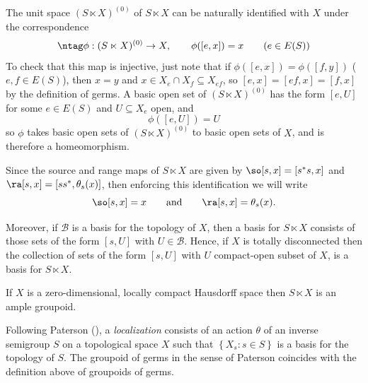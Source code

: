 The unit space $(S\ltimes X)^{(0)}$ of $S\ltimes X$ can be naturally identified with $X$ under the correspondence
\begin{align*}\ntag\label{eq:identification}
\phi:(S\ltimes X)^{(0)}\to X,\qquad\phi([e,x])=x\qquad(e\in E(S))
\end{align*}
To check that this map is injective, just note that if $\phi([e,x])=\phi([f,y])$ ($e,f\in E(S)$), then $x=y$ and $x\in X_e\cap X_f\subseteq X_{ef}$, so $[e,x]=[ef,x]=[f,x]$ by the definition of germs. A basic open set of $(S\ltimes X)^{(0)}$ has the form $[e,U]$ for some $e\in E(S)$ and $U\subseteq X_e$ open, and
\[\phi([e,U])=U\]
so $\phi$ takes basic open sets of $(S\ltimes X)^{(0)}$ to basic open sets of $X$, and is therefore a homeomorphism.

Since the source and range maps of $S\ltimes X$ are given by $\so[s, x]= [s^*s, x]$ and $\ra[s,x]=[ss^*,\theta_s(x)]$, then enforcing this identification we will write
\[\so[s, x] = x\qquad\text{and}\qquad\ra[s, x] = \theta_s(x).\]

Moreover, if $\mathscr{B}$ is a basis for the topology of $X$, then a basis for $S\ltimes X$ consists of those sets of the form $[s,U]$ with $U\in \mathscr{B}$. Hence, if $X$ is totally disconnected then the collection of sets of the form $[s,U]$ with $U$ compact-open subset of $X$, is a basis for $S\ltimes X$.

\begin{corollary}
If $X$ is a zero-dimensional, locally compact Hausdorff space then $S\ltimes X$ is an ample groupoid.
\end{corollary}

\begin{example}
Following Paterson (\cite{MR1724106}), a \emph{localization} consists of an action $\theta$ of an inverse semigroup $S$ on a topological space $X$ such that $\left\{X_s:s\in S\right\}$ is a basis for the topology of $S$. The groupoid of germs in the sense of Paterson coincides with the definition above of groupoids of germs.
\end{example}

